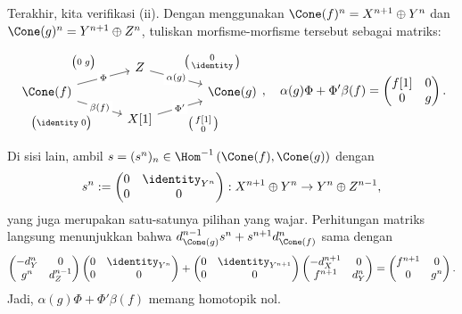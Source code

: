 \begin{bukti}
	Terakhir, kita verifikasi (ii). Dengan menggunakan
	$\Cone(f)^n=X^{n+1}\oplus Y^n$ dan
	$\Cone(g)^n=Y^{n+1}\oplus Z^n$, tuliskan morfisme-morfisme tersebut sebagai
	matriks:
	\begin{gather*}\begin{tikzcd}[row sep=tiny, column sep=large, ampersand replacement=\&]
		\& Z \arrow[rd, "\alpha(g)" description, "{\bigl(\begin{smallmatrix} 0 \\ \identity \end{smallmatrix} \bigr)}" inner sep=0.6em] \& \\
		\Cone(f) \arrow[ru, "\Phi" description, "{\bigl( 0 \; g \bigr)}" inner sep=0.6em] \arrow[rd, "\beta(f)" description, "{\big( \identity \; 0 \bigr)}"' inner sep=0.6em] \& \& \Cone(g) \\
		\& X[1] \arrow[ru, "{\Phi'}" description, "{\bigl( \begin{smallmatrix} f[1] \\ 0 \end{smallmatrix} \bigr)}"' inner sep=0.6em] \&
	\end{tikzcd}, \quad
		\alpha(g) \Phi + \Phi' \beta(f) = \begin{pmatrix} f[1] & 0 \\ 0 & g  \end{pmatrix}.
	\end{gather*}
	Di sisi lain, ambil $s=(s^n)_n\in
	\Hom^{-1}\left(\Cone(f),\Cone(g)\right)$ dengan
	\[ s^n := \begin{pmatrix}
		0 & \identity_{Y^n} \\
		0 & 0
	\end{pmatrix}: X^{n+1} \oplus Y^n \to Y^n \oplus Z^{n-1} , \]
	yang juga merupakan satu-satunya pilihan yang wajar. Perhitungan matriks
	langsung menunjukkan bahwa
	$d_{\Cone(g)}^{n-1}s^n+s^{n+1}d_{\Cone(f)}^n$ sama dengan
	\[\begin{pmatrix}
		-d_Y^n & 0 \\
		g^n & d_Z^{n-1}
	\end{pmatrix} \begin{pmatrix}
		0 & \identity_{Y^n} \\
		0 & 0
	\end{pmatrix} + \begin{pmatrix}
		0 & \identity_{Y^{n+1}} \\
		0 & 0
	\end{pmatrix} \begin{pmatrix}
		-d_X^{n+1} & 0 \\
		f^{n+1} & d_Y^n
	\end{pmatrix} = \begin{pmatrix}
		f^{n+1} & 0 \\
		0 & g^n
	\end{pmatrix}.\]
	Jadi, $\alpha(g)\Phi+\Phi'\beta(f)$ memang homotopik nol.
\end{bukti}

